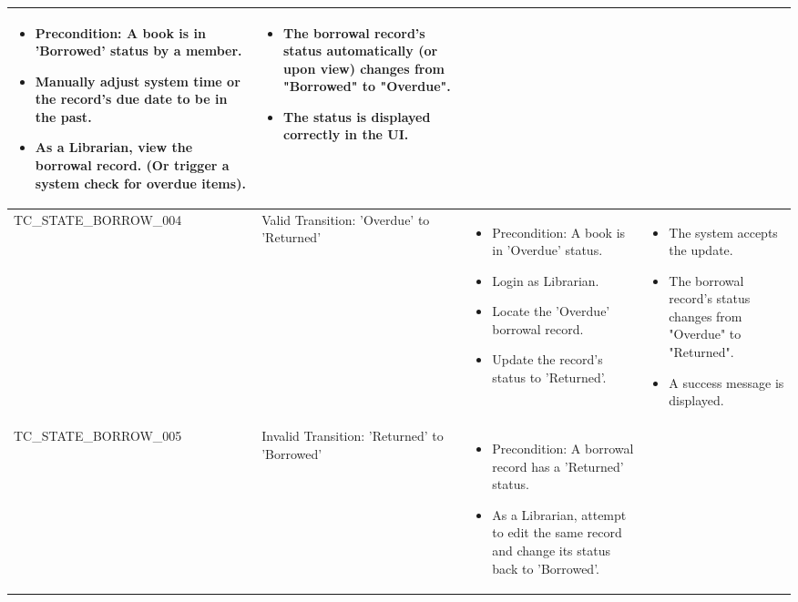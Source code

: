 \documentclass[10pt, a4paper]{report}
\begin{document}
\begin{longtable}{|>{\raggedright\arraybackslash}p{4cm}|>{\raggedright\arraybackslash}p{4cm}|>{\raggedright\arraybackslash}p{4.5cm}|>{\raggedright\arraybackslash}p{4cm}|}
\begin{itemize}[noitemsep, topsep=0pt, partopsep=0pt, leftmargin=*]
        \item Precondition: A book is in 'Borrowed' status by a member.
        \item Manually adjust system time or the record's due date to be in the past.
        \item As a Librarian, view the borrowal record. (Or trigger a system check for overdue items).
    \end{itemize} & 
    \begin{itemize}[noitemsep, topsep=0pt, partopsep=0pt, leftmargin=*]
        \item The borrowal record's status automatically (or upon view) changes from "Borrowed" to "Overdue".
        \item The status is displayed correctly in the UI.
    \end{itemize} \\ \hline
TC\_STATE\_BORROW\_004 & Valid Transition: 'Overdue' to 'Returned' & 
    \begin{itemize}[noitemsep, topsep=0pt, partopsep=0pt, leftmargin=*]
        \item Precondition: A book is in 'Overdue' status.
        \item Login as Librarian.
        \item Locate the 'Overdue' borrowal record.
        \item Update the record's status to 'Returned'. 
    \end{itemize} & 
    \begin{itemize}[noitemsep, topsep=0pt, partopsep=0pt, leftmargin=*]
        \item The system accepts the update.
        \item The borrowal record's status changes from "Overdue" to "Returned".
        \item A success message is displayed.
    \end{itemize} \\ \hline
TC\_STATE\_BORROW\_005 & Invalid Transition: 'Returned' to 'Borrowed' & 
    \begin{itemize}[noitemsep, topsep=0pt, partopsep=0pt, leftmargin=*]
        \item Precondition: A borrowal record has a 'Returned' status.
        \item As a Librarian, attempt to edit the same record and change its status back to 'Borrowed'.
    \end{itemize} & 
    \begin{itemize}[noitemsep, topsep=0pt, partopsep=0pt, leftmargin=*]

\end{itemize}
\end{longtable}
\end{document}
